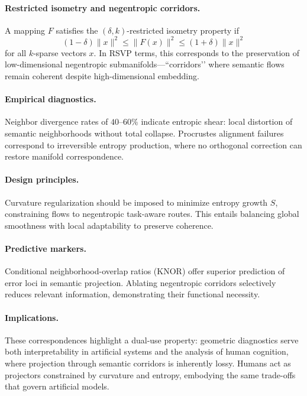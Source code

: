 \documentclass{article}
\theoremstyle{definition}
\begin{document}
\paragraph{Restricted isometry and negentropic corridors.}  
A mapping $F$ satisfies the $(\delta,k)$-restricted isometry property if
\[
(1-\delta)\|x\|^2 \leq \|F(x)\|^2 \leq (1+\delta)\|x\|^2
\]
for all $k$-sparse vectors $x$. In RSVP terms, this corresponds to the
preservation of low-dimensional negentropic submanifolds—``corridors’’ where
semantic flows remain coherent despite high-dimensional embedding.

\paragraph{Empirical diagnostics.}  
Neighbor divergence rates of $40$--$60\%$ indicate entropic shear: local
distortion of semantic neighborhoods without total collapse. Procrustes
alignment failures correspond to irreversible entropy production, where no
orthogonal correction can restore manifold correspondence.

\paragraph{Design principles.}  
Curvature regularization should be imposed to minimize entropy growth $S$,
constraining flows to negentropic task-aware routes. This entails balancing
global smoothness with local adaptability to preserve coherence.

\paragraph{Predictive markers.}  
Conditional neighborhood-overlap ratios (KNOR) offer superior prediction of
error loci in semantic projection. Ablating negentropic corridors selectively
reduces relevant information, demonstrating their functional necessity.

\paragraph{Implications.}  
These correspondences highlight a dual-use property: geometric diagnostics
serve both interpretability in artificial systems and the analysis of human
cognition, where projection through semantic corridors is inherently lossy.
Humans act as projectors constrained by curvature and entropy, embodying the
same trade-offs that govern artificial models.
\end{document}
